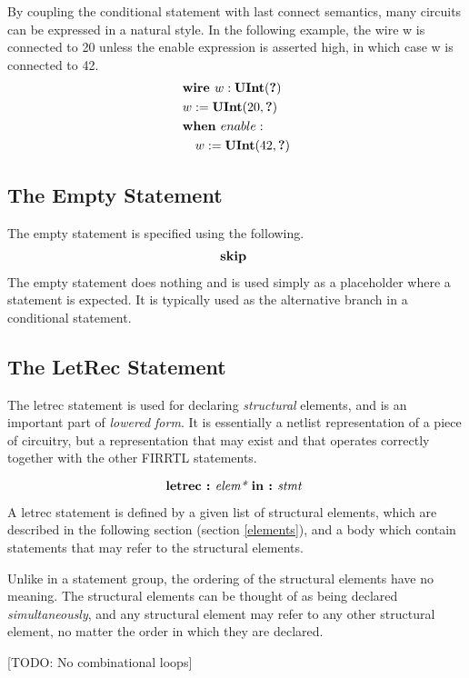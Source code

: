 \documentclass[12pt]{article}
\begin{document}
By coupling the conditional statement with last connect semantics, many circuits can be expressed in a natural style. In the following example, the wire w is connected to 20 unless the enable expression is asserted high, in which case w is connected to 42. 
\[
\begin{aligned}
&\text{\bf wire\ } w : \text{\bf UInt}(\text{\bf ?}) \\
&w := \text{\bf UInt}(20, \text{\bf ?}) \\
&\text{\bf when\ } enable : \\
&\quad w := \text{\bf UInt}(42, \text{\bf ?}) \\
\end{aligned}
\]

\subsection{The Empty Statement}
The empty statement is specified using the following.
\[
\begin{aligned}
\text{\bf skip\ }
\end{aligned}
\]
The empty statement does nothing and is used simply as a placeholder where a statement is expected. It is typically used as the alternative branch in a conditional statement. 

\subsection{The LetRec Statement}
The letrec statement is used for declaring {\em structural} elements, and is an important part of {\em lowered form}. It is essentially a netlist representation of a piece of circuitry, but a representation that may exist and that operates correctly together with the other FIRRTL statements. 

\[
\text{\bf letrec :\ } \text{\em elem*\ } \text{\bf in :\ } \text{\em stmt\ }                           
\]

A letrec statement is defined by a given list of structural elements, which are described in the following section (section \ref{elements}), and a body which contain statements that may refer to the structural elements.

Unlike in a statement group, the ordering of the structural elements have no meaning. The structural elements can be thought of as being declared {\em simultaneously}, and any structural element may refer to any other structural element, no matter the order in which they are declared. 

[TODO: No combinational loops]
\end{document}
